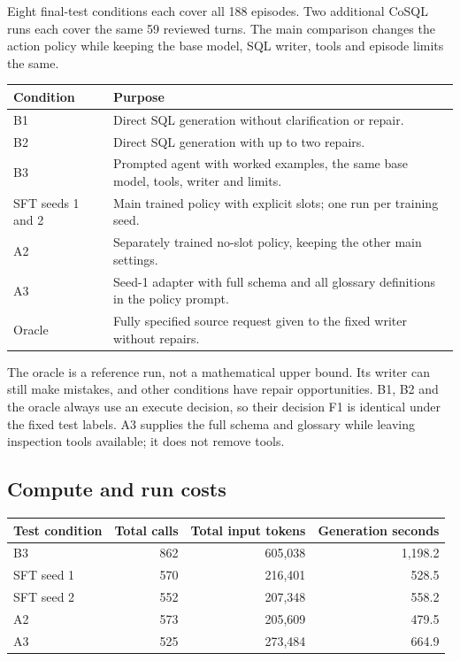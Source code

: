 \documentclass[11pt,a4paper]{article}
\begin{document}
Eight final-test conditions each cover all 188 episodes. Two additional CoSQL runs each cover the same
59 reviewed turns. The main comparison changes the action policy while keeping the base model,
SQL writer, tools and episode limits the same.

\begin{tabularx}{\linewidth}{@{}lY@{}}
\toprule
Condition & Purpose \\
\midrule
B1 & Direct SQL generation without clarification or repair. \\
B2 & Direct SQL generation with up to two repairs. \\
B3 & Prompted agent with worked examples, the same base model, tools, writer and limits. \\
SFT seeds 1 and 2 & Main trained policy with explicit slots; one run per training seed. \\
A2 & Separately trained no-slot policy, keeping the other main settings. \\
A3 & Seed-1 adapter with full schema and all glossary definitions in the policy prompt. \\
Oracle & Fully specified source request given to the fixed writer without repairs. \\
\bottomrule
\end{tabularx}

The oracle is a reference run, not a mathematical upper bound. Its writer can still make mistakes, and
other conditions have repair opportunities. B1, B2 and the oracle always use an execute decision, so
their decision F1 is identical under the fixed test labels.
A3 supplies the full schema and glossary while leaving inspection tools available; it does not remove tools.

\subsection{Compute and run costs}

\begin{center}
\small
\begin{tabular}{lrrr}
\toprule
Test condition & Total calls & Total input tokens & Generation seconds \\
\midrule
B3 & 862 & 605,038 & 1,198.2 \\
SFT seed 1 & 570 & 216,401 & 528.5 \\
SFT seed 2 & 552 & 207,348 & 558.2 \\
A2 & 573 & 205,609 & 479.5 \\
A3 & 525 & 273,484 & 664.9 \\
\bottomrule
\end{tabular}
\end{center}
\end{document}
